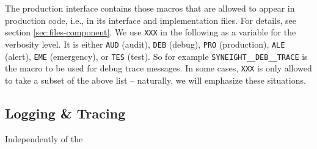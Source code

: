 The production interface contains those macros that are allowed to
appear in production code, i.e., in its interface and implementation
files. For details, see section \vref{sec:files-component}. 
%
We use {\tt XXX} in the following as a variable for the verbosity
level. It is either {\tt AUD} (audit), {\tt DEB} (debug), {\tt PRO}
(production), {\tt ALE} (alert), {\tt EME} (emergency), or {\tt TES}
(test).
%
So for example {\tt SYNEIGHT\_\_DEB\_\_TRACE} is the macro to be used
for debug trace messages.
%
In some cases, {\tt XXX} is only allowed to take a subset of the above
list -- naturally, we will emphasize these situations.
%
%


\subsection{Logging \& Tracing}
\label{sec:logging--tracing}


Independently of the 

